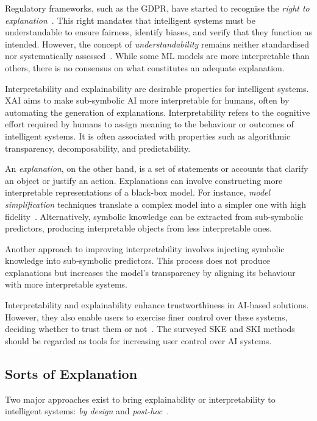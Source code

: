 Regulatory frameworks, such as the \gls{GDPR}, have started to recognise the \emph{right to explanation}~\cite{DBLP:journals/aim/GoodmanF17}.
%
This right mandates that intelligent systems must be understandable to ensure fairness, identify biases, and verify that they function as intended.
%
However, the concept of \emph{understandability} remains neither standardised nor systematically assessed~\cite{DBLP:journals/ai/Miller19}.
%
While some \gls{ML} models are more interpretable than others, there is no consensus on what constitutes an adequate explanation.


Interpretability and explainability are desirable properties for intelligent systems.
%
\Gls{XAI} aims to make sub-symbolic \gls{AI} more interpretable for humans, often by automating the generation of explanations.
%
Interpretability refers to the cognitive effort required by humans to assign meaning to the behaviour or outcomes of intelligent systems.
%
It is often associated with properties such as algorithmic transparency, decomposability, and predictability.


An \emph{explanation}, on the other hand, is a set of statements or accounts that clarify an object or justify an action.
%
Explanations can involve constructing more interpretable representations of a black-box model.
%
For instance, \emph{model simplification} techniques translate a complex model into a simpler one with high fidelity~\cite{DBLP:conf/kdd/TolomeiSHL17,DBLP:journals/csur/GuidottiMRTGP19}.
%
Alternatively, symbolic knowledge can be extracted from sub-symbolic predictors, producing interpretable objects from less interpretable ones.


Another approach to improving interpretability involves injecting symbolic knowledge into sub-symbolic predictors.
%
This process does not produce explanations but increases the model's transparency by aligning its behaviour with more interpretable systems.

Interpretability and explainability enhance trustworthiness in \gls{AI}-based solutions.
%
However, they also enable users to exercise finer control over these systems, deciding whether to trust them or not~\cite{10.1214/21-SS133}.
%
The surveyed \gls{SKE} and \gls{SKI} methods should be regarded as tools for increasing user control over \gls{AI} systems.


\subsection{Sorts of Explanation}\label{subsec:sorts-of-explanation}
%
Two major approaches exist to bring explainability or interpretability to intelligent systems: \emph{by design} and \emph{post-hoc}~\cite{DBLP:conf/atal/CiattoSOC20,DBLP:journals/inffus/ArrietaRSBTBGGM20,DBLP:journals/csur/GuidottiMRTGP19}.


